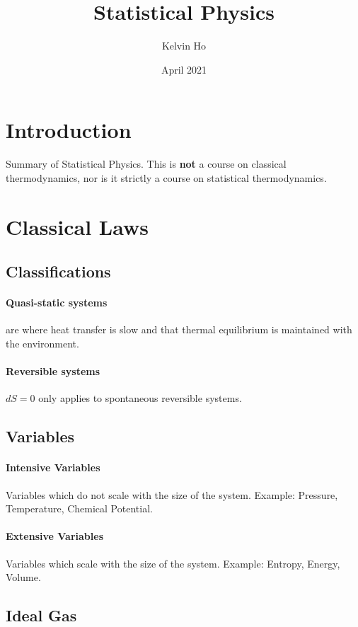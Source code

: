 \documentclass[12pt]{article}
\title{Statistical Physics}
\author{Kelvin Ho}
\date{April 2021}
\begin{document}
\maketitle


\section{Introduction}
Summary of Statistical Physics. This is \textbf{not} a course on classical thermodynamics, nor is it strictly a course on statistical thermodynamics.

\section{Classical Laws}

\subsection{Classifications}

\paragraph{Quasi-static systems} are where heat transfer is slow and that thermal equilibrium is maintained with the environment.

\paragraph{Reversible systems}
$dS = 0$ only applies to spontaneous reversible systems.



\subsection{Variables}
\paragraph{Intensive Variables}
Variables which do not scale with the size of the system. Example: Pressure, Temperature, Chemical Potential.

\paragraph{Extensive Variables}
Variables which scale with the size of the system. Example: Entropy, Energy, Volume.

\subsection{Ideal Gas}
\end{document}
